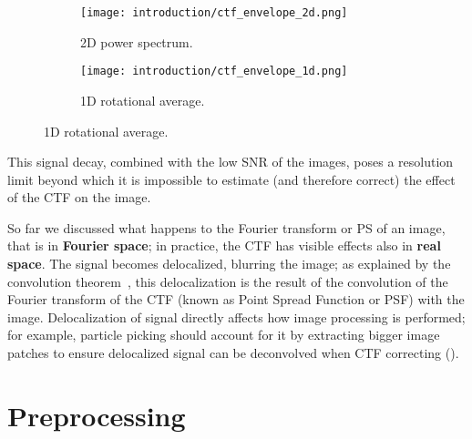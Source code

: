 \begin{figure}[ht]
    \centering
    \begin{subfigure}[B]{.42\textwidth}
        \centering
        \texttt{[image: introduction/ctf\_envelope\_2d.png]}
        \caption{2D power spectrum.}
        \label{fig:em_ctf_envelope_2d}
    \end{subfigure}%
    \hfill
    \begin{subfigure}[B]{.55\textwidth}
        \centering
        \texttt{[image: introduction/ctf\_envelope\_1d.png]}
        \caption{1D rotational average.}
        \label{fig:em_ctf_envelope_1d}
    \end{subfigure}%
    \label{fig:em_ctf_envelope}
\end{figure}

This signal decay, combined with the low SNR of the images, poses a resolution limit beyond which it is impossible to estimate (and therefore correct) the effect of the CTF on the image.

So far we discussed what happens to the Fourier transform or PS of an image, that is in \textbf{Fourier space}; in practice, the CTF has visible effects also in \textbf{real space}.
The signal becomes delocalized, blurring the image; as explained by the convolution theorem~\cite{wikipediaConvolutionTheorem2024}, this delocalization is the result of the convolution of the Fourier transform of the CTF (known as Point Spread Function or PSF) with the image.
Delocalization of signal directly affects how image processing is performed; for example, particle picking should account for it by extracting bigger image patches to ensure delocalized signal can be deconvolved when CTF correcting ().

\section{Preprocessing}\label{em_preprocessing}

